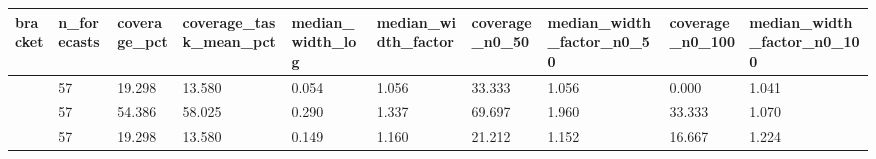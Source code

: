 \begin{tabular}{llllllllll}
\hline
bracket & n\_forecasts & coverage\_pct & coverage\_task\_mean\_pct & median\_width\_log & median\_width\_factor & coverage\_n0\_50 & median\_width\_factor\_n0\_50 & coverage\_n0\_100 & median\_width\_factor\_n0\_100 \\
\hline
[RPM-T, RPM] & 57 & 19.298 & 13.580 & 0.054 & 1.056 & 33.333 & 1.056 & 0.000 & 1.041 \\
[IPL3, FLAT] & 57 & 54.386 & 58.025 & 0.290 & 1.337 & 69.697 & 1.960 & 33.333 & 1.070 \\
[RPM, FLAT] & 57 & 19.298 & 13.580 & 0.149 & 1.160 & 21.212 & 1.152 & 16.667 & 1.224 \\
\hline
\end{tabular}
